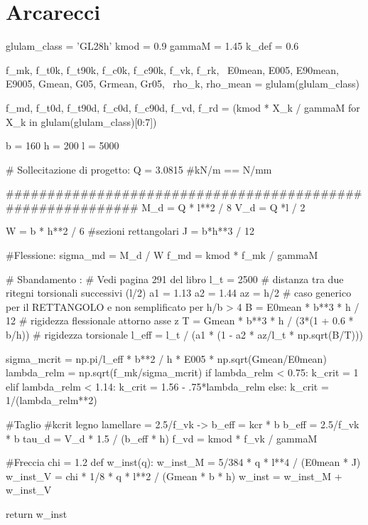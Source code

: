\section{Arcarecci}
\begin{pycode}[arcarecci]
glulam_class = 'GL28h'
kmod = 0.9
gammaM = 1.45
k_def = 0.6

f_mk, f_t0k, f_t90k, f_c0k, f_c90k, f_vk, f_rk, \
E0mean, E005, E90mean, E9005, Gmean, G05, Grmean, Gr05, \
rho_k, rho_mean = glulam(glulam_class)

f_md, f_t0d, f_t90d, f_c0d, f_c90d, f_vd, f_rd = (kmod * X_k / gammaM for X_k in glulam(glulam_class)[0:7])

b = 160
h = 200
l = 5000

# Sollecitazione di progetto:
Q = 3.0815 #kN/m == N/mm

###########################################################
M_d = Q * l**2 / 8
V_d = Q *l / 2

W = b * h**2 / 6 #sezioni rettangolari
J = b*h**3 / 12

#Flessione:
sigma_md = M_d / W
f_md = kmod * f_mk / gammaM

# Sbandamento :
# Vedi pagina 291 del libro
l_t = 2500 # distanza tra due ritegni torsionali successivi (l/2)
a1 = 1.13
a2 = 1.44
az = h/2
# caso generico per il RETTANGOLO e non semplificato per h/b > 4
B = E0mean * b**3 * h / 12 # rigidezza flessionale attorno asse z
T = Gmean * b**3 * h / (3*(1 + 0.6 * b/h)) # rigidezza torsionale 
l_eff = l_t / (a1 * (1 - a2 * az/l_t * np.sqrt(B/T)))

sigma_mcrit = np.pi/l_eff * b**2 / h * E005 * np.sqrt(Gmean/E0mean)
lambda_relm = np.sqrt(f_mk/sigma_mcrit)
if lambda_relm < 0.75:
    k_crit = 1
elif lambda_relm < 1.14:
    k_crit = 1.56 - .75*lambda_relm
else:
    k_crit = 1/(lambda_relm**2)


#Taglio    
#kcrit legno lamellare = 2.5/f_vk -> b_eff = kcr * b
b_eff = 2.5/f_vk * b
tau_d = V_d * 1.5 / (b_eff * h)
f_vd = kmod * f_vk / gammaM

#Freccia
chi = 1.2
def w_inst(q): 
    w_inst_M = 5/384 * q * l**4 / (E0mean * J)
    w_inst_V = chi * 1/8 * q * l**2 / (Gmean * b * h)
    w_inst = w_inst_M + w_inst_V
    
    return w_inst

\end{pycode}

